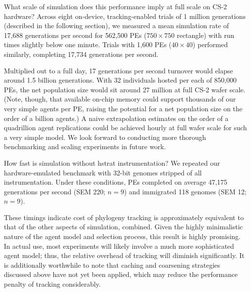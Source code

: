 What scale of simulation does this performance imply at full scale on CS-2 hardware?
Across eight on-device, tracking-enabled trials of 1 million generations (described in the following section), we measured a mean simulation rate of 17,688 generations per second for 562,500 PEs ($750\times750$ rectangle) with run times slightly below one minute.
Trials with 1,600 PEs ($40\times40$) performed similarly, completing 17,734 generations per second.

Multiplied out to a full day, 17 generations per second turnover would elapse around 1.5 billion generations.
With 32 individuals hosted per each of 850,000 PEs, the net population size would sit around 27 million at full CS-2 wafer scale.
(Note, though, that available on-chip memory could support thousands of our very simple agents per PE, raising the potential for a net population size on the order of a billion agents.)
A naive extrapolation estimates on the order of a quadrillion agent replications could be achieved hourly at full wafer scale for such a very simple model.
We look forward to conducting more thorough benchmarking and scaling experiments in future work.

How fast is simulation without hstrat instrumentation?
We repeated our hardware-emulated benchmark with 32-bit genomes stripped of all instrumentation.
Under these conditions, PEs completed on average 47,175 generations per second (SEM 220; $n=9$) and immigrated 118 genomes (SEM 12; $n=9$).

These timings indicate cost of phylogeny tracking is approximately equivalent to that of the other aspects of simulation, combined.
Given the highly minimalistic nature of the agent model and selection process, this result is highly promising.
In actual use, most experiments will likely involve a much more sophisticated agent model; thus, the relative overhead of tracking will diminish significantly.
It is additionally worthwhile to note that caching and coarsening strategies discussed above have not yet been applied, which may reduce the performance penalty of tracking considerably.

